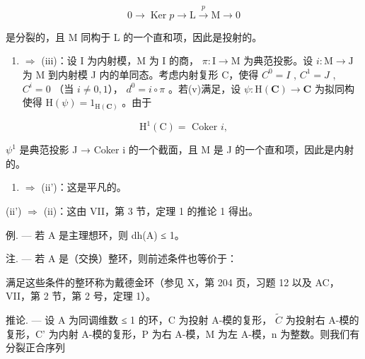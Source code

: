 \[
0 \rightarrow \operatorname{Ker} p \rightarrow \mathrm{L} \xrightarrow {p} \mathrm{M} \rightarrow 0
\]

是分裂的，且 M 同构于 L 的一个直和项，因此是投射的。

\begin{enumerate}
\def\labelenumi{(\alph{enumi})}
\setcounter{enumi}{21}
\tightlist
\item
  \(\Rightarrow\) (iii)：设 I 为内射模，M 为 I 的商， \(\pi : \mathrm{I} \to \mathrm{M}\) 为典范投影。设 \(i: \mathrm{M} \to \mathrm{J}\) 为 M 到内射模 J 内的单同态。考虑内射复形 C，使得 \(C^0 = I\) , \(C^1 = J\) , \(C^i = 0\) （当 \(i \neq 0, 1\)）， \(d^0 = i \circ \pi\) 。若(v)满足，设 \(\psi : \mathrm{H}(\mathbf{C}) \to \mathbf{C}\) 为拟同构使得 \(\mathrm{H}(\psi) = 1_{\mathrm{H}(\mathbf{C})}\) 。由于
\end{enumerate}

\[
\mathrm{H} ^ {1} (\mathrm{C}) = \text { Coker } i  ,
\]

\(\psi^{1}\) 是典范投影 J → Coker i 的一个截面，且 M 是 J 的一个直和项，因此是内射的。

\begin{enumerate}
\def\labelenumi{(\roman{enumi})}
\setcounter{enumi}{1}
\tightlist
\item
  \(\Rightarrow\) (ii')：这是平凡的。
\end{enumerate}

(ii') \(\Rightarrow\) (ii)：这由 VII，第 3 节，定理 1 的推论 1 得出。

例. --- 若 A 是主理想环，则 dh(A) ≤ 1。

注. --- 若 A 是（交换）整环，则前述条件也等价于：

满足这些条件的整环称为戴德金环（参见 X，第 204 页，习题 12 以及 AC，VII，第 2 节，第 2 号，定理 1）。

推论. --- 设 A 为同调维数 ≤ 1 的环，C 为投射 A-模的复形， \(\tilde{C}\) 为投射右 A-模的复形，C' 为内射 A-模的复形，P 为右 A-模，M 为左 A-模，n 为整数。则我们有分裂正合序列

